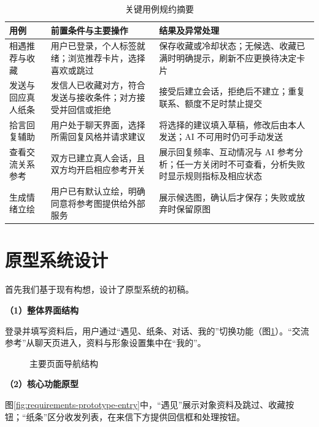 \begin{table}[H]
\centering
\small
\caption{关键用例规约摘要}
\label{tab:req-uc-summary}
\begin{tabularx}{\linewidth}{@{}>{\raggedright\arraybackslash}p{32mm}>{\raggedright\arraybackslash}p{49mm}>{\raggedright\arraybackslash}X@{}}
\toprule
用例 & 前置条件与主要操作 & 结果及异常处理 \\
\midrule
相遇推荐与收藏 & 用户已登录，个人标签就绪；浏览推荐卡片，选择喜欢或跳过 & 保存收藏或冷却状态；无候选、收藏已满时明确提示，刷新不应更换待决定卡片 \\
发送与回应真人纸条 & 发信人已收藏对方，符合发送与接收条件；对方接受并回信或拒绝 & 接受后建立会话，拒绝后不建立；重复联系、额度不足时禁止提交 \\
拾言回复辅助 & 用户处于聊天界面，选择所需回复风格并请求建议 & 将选择的建议填入草稿，修改后由本人发送；AI 不可用时仍可手动发送 \\
查看交流关系参考 & 双方已建立真人会话，且双方均开启相应参考开关 & 展示回复频率、互动情况与 AI 参考分析；任一方关闭时不可查看，分析失败时显示规则指标及相应状态 \\
生成情绪立绘 & 用户已有默认立绘，明确同意将参考图提供给外部服务 & 展示候选图，确认后才保存；失败或放弃时保留原图 \\
\bottomrule
\end{tabularx}
\end{table}


\section{原型系统设计}

首先我们基于现有构想，设计了原型系统的初稿。

\noindent\textbf{（1）整体界面结构}

登录并填写资料后，用户通过“遇见、纸条、对话、我的”切换功能（图\ref{fig:requirements-navigation}）。“交流参考”从聊天页进入，资料与形象设置集中在“我的”。

\begin{figure}[H]
\centering

\caption{主要页面导航结构}
\label{fig:requirements-navigation}
\end{figure}

\noindent\textbf{（2）核心功能原型}

图\ref{fig:requirements-prototype-entry}中，“遇见”展示对象资料及跳过、收藏按钮；“纸条”区分收发列表，在来信下方提供回信框和处理按钮。

